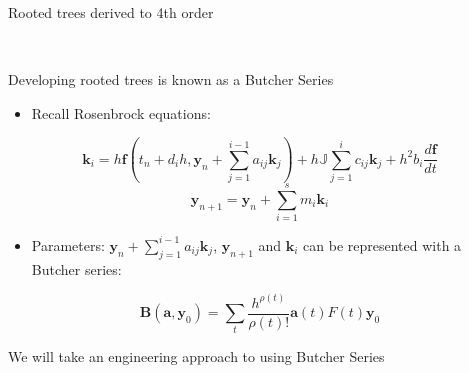 \documentclass[serif]{beamer}
\begin{document}
\begin{frame}{Rooted trees derived to 4th order}
\begin{center}
{} \\ \vspace{1cm}
\end{center}
\end{frame}

\begin{frame}{Developing rooted trees is known as a Butcher Series}
  \begin{itemize}
    \item<1-> Recall Rosenbrock equations:
  \end{itemize}
  \begin{equation}
    \nonumber \mathbf{k}_{i} = h\mathbf{f} \left(t_n + d_ih,\mathbf{y}_n + \sum_{j=1}^{i-1}a_{ij}\mathbf{k}_{j}\right) 
                                + h\mathbb{J}\sum_{j=1}^i c_{ij}\mathbf{k}_{j}  + h^2b_i\frac{d\mathbf{f}}{dt}
  \end{equation}
  \begin{equation}
    \nonumber \mathbf{y}_{n+1} = \mathbf{y}_{n} + \sum_{i=1}^s m_i\mathbf{k}_i
  \end{equation}
  \begin{itemize}
  \item<1->  Parameters: $\mathbf{y}_n + \sum_{j=1}^{i-1}a_{ij}\mathbf{k}_{j}$, $\mathbf{y}_{n+1}$ and $\mathbf{k}_i$ can be represented with a Butcher series:
  \end{itemize}
  \begin{equation}
    \nonumber
    \mathbf{B}\left(\mathbf{a}, \mathbf{y}_0\right) = \sum_t \frac{h^{\rho\left(t\right)}}{\rho\left(t\right)!}\mathbf{a}\left(t\right)F\left(t\right)\mathbf{y}_0
  \end{equation}
  \begin{center}
    \alert{We will take an engineering approach to using Butcher Series}
  \end{center}
\end{frame}
\end{document}
